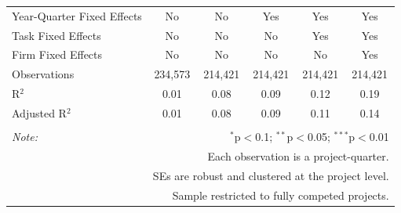 \documentclass[
]{article}
\begin{document}
\begin{table}[H]
\begin{tabular}{@{\extracolsep{-2pt}}lccccc}
Year-Quarter Fixed Effects & No & No & Yes & Yes & Yes \\ 
Task Fixed Effects & No & No & No & Yes & Yes \\ 
Firm Fixed Effects & No & No & No & No & Yes \\ 
Observations & 234,573 & 214,421 & 214,421 & 214,421 & 214,421 \\ 
R$^{2}$ & 0.01 & 0.08 & 0.09 & 0.12 & 0.19 \\ 
Adjusted R$^{2}$ & 0.01 & 0.08 & 0.09 & 0.11 & 0.14 \\ 
\hline 
\hline \\[-1.8ex] 
\textit{Note:}  & \multicolumn{5}{r}{$^{*}$p$<$0.1; $^{**}$p$<$0.05; $^{***}$p$<$0.01} \\ 
 & \multicolumn{5}{r}{Each observation is a project-quarter.} \\ 
 & \multicolumn{5}{r}{SEs are robust and clustered at the project level.} \\ 
 & \multicolumn{5}{r}{Sample restricted to fully competed projects.} \\ 
\end{tabular} 
\end{table}
\end{document}
